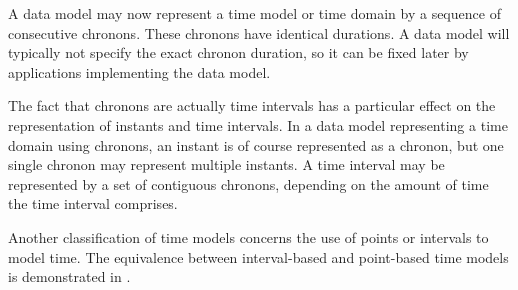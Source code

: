 A data model may now represent a time model or time domain by a sequence of consecutive chronons. These chronons have identical durations. A data model will typically not specify the exact chronon duration, so it can be fixed later by applications implementing the data model.

The fact that chronons are actually time intervals has a particular effect on the representation of instants and time intervals. In a data model representing a time domain using chronons, an instant is of course represented as a chronon, but one single chronon may represent multiple instants. A time interval may be represented by a set of contiguous chronons, depending on the amount of time the time interval comprises.



Another classification of time models concerns the use of points or intervals to model time. The equivalence between interval-based and point-based time models is demonstrated in \cite{Böhlen_point-versus}.

